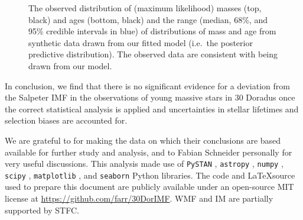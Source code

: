 \documentclass[apjl]{emulateapj}
\newcommand{\MSun}{M_\odot}
\begin{document}
\begin{figure}
    		\caption{The observed distribution of (maximum likelihood) masses (top, black) and ages (bottom, black) and the range (median, 68\%, and 95\% credible intervals in blue) of distributions of mass and age from synthetic data drawn from our fitted model (i.e.\ the posterior predictive distribution).  The observed data are consistent with being drawn from our model.  %
		}\label{fig:PPC}
\end{figure}


In conclusion, we find that there is no significant evidence for a deviation from the Salpeter IMF \citep{Salpeter:1955} in the observations of young massive stars in 30 Doradus once the correct statistical analysis is applied and uncertainties in stellar lifetimes and selection biases are accounted for.

\acknowledgments

We are grateful to \citet{Schneider:2018} for making the data on which their conclusions are
based available for further study and analysis, and to Fabian Schneider personally for very useful discussions.  This analysis made use of \texttt{PySTAN} \citep{PySTAN}, \texttt{astropy} \citep{astropy}, \texttt{numpy} \citep{numpy}, \texttt{scipy} \citep{scipy}, \texttt{matplotlib} \citep{matplotlib}, and \texttt{seaborn} \citep{seaborn} Python libraries.  The code and \LaTeX source used to prepare this document are publicly available under an open-source MIT license at \url{https://github.com/farr/30DorIMF}.  WMF and IM are partially supported by STFC.



\end{document}
